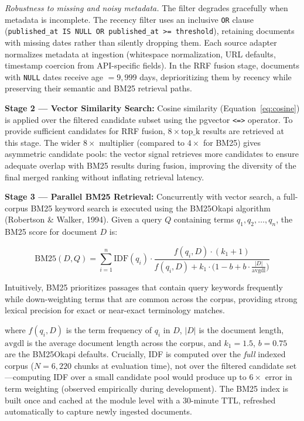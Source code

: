 \textit{Robustness to missing and noisy metadata.} The filter degrades gracefully when metadata is incomplete. The recency filter uses an inclusive \texttt{OR} clause (\texttt{published\_at IS NULL OR published\_at >= threshold}), retaining documents with missing dates rather than silently dropping them. Each source adapter normalizes metadata at ingestion (whitespace normalization, URL defaults, timestamp coercion from API-specific fields). In the RRF fusion stage, documents with \texttt{NULL} dates receive age $= 9{,}999$ days, deprioritizing them by recency while preserving their semantic and BM25 retrieval paths.

\textbf{Stage 2 --- Vector Similarity Search:} Cosine similarity (Equation~\ref{eq:cosine}) is applied over the filtered candidate subset using the pgvector \texttt{<=>} operator. To provide sufficient candidates for RRF fusion, $8 \times \text{top\_k}$ results are retrieved at this stage. The wider $8\times$ multiplier (compared to $4\times$ for BM25) gives asymmetric candidate pools: the vector signal retrieves more candidates to ensure adequate overlap with BM25 results during fusion, improving the diversity of the final merged ranking without inflating retrieval latency.

\textbf{Stage 3 --- Parallel BM25 Retrieval:} Concurrently with vector search, a full-corpus BM25 keyword search is executed using the BM25Okapi algorithm (Robertson \& Walker, 1994). Given a query $Q$ containing terms $q_1, q_2, \ldots, q_n$, the BM25 score for document $D$ is:

\begin{equation}
  \text{BM25}(D, Q) = \sum_{i=1}^{n} \text{IDF}(q_i) \cdot \frac{f(q_i, D) \cdot (k_1 + 1)}{f(q_i, D) + k_1 \cdot \bigl(1 - b + b \cdot \frac{|D|}{\text{avgdl}}\bigr)}
  \label{eq:bm25}
\end{equation}

Intuitively, BM25 prioritizes passages that contain query keywords frequently while down-weighting terms that are common across the corpus, providing strong lexical precision for exact or near-exact terminology matches.

\noindent where $f(q_i, D)$ is the term frequency of $q_i$ in $D$, $|D|$ is the document length, $\text{avgdl}$ is the average document length across the corpus, and $k_1 = 1.5$, $b = 0.75$ are the BM25Okapi defaults. Crucially, IDF is computed over the \emph{full} indexed corpus ($N = 6{,}220$ chunks at evaluation time), not over the filtered candidate set---computing IDF over a small candidate pool would produce up to $6\times$ error in term weighting (observed empirically during development). The BM25 index is built once and cached at the module level with a 30-minute TTL, refreshed automatically to capture newly ingested documents.

